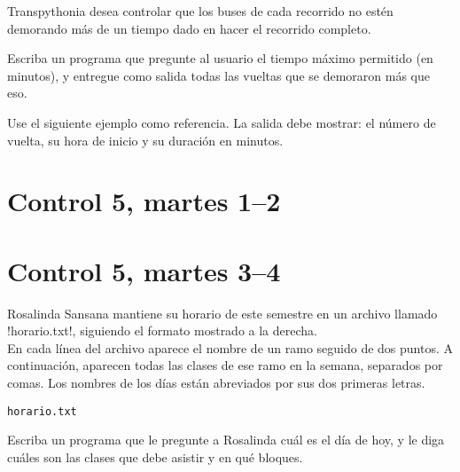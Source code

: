 \documentclass[12pt,spanish,a5paper,landscape]{article}
\begin{document}
  Transpythonia desea controlar que los buses de cada recorrido
  no estén demorando más de un tiempo dado
  en hacer el recorrido completo.

  Escriba un programa que pregunte al usuario
  el tiempo máximo permitido (en minutos),
  y entregue como salida todas las vueltas
  que se demoraron más que eso.

  Use el siguiente ejemplo como referencia.
  La salida debe mostrar:
  el número de vuelta,
  su hora de inicio
  y su duración en minutos.

  \begin{minipage}[t]{0.6\textwidth}
    
  \end{minipage}


  \newpage

  \part*{Control 5, martes 1--2}
  \newpage

  \newpage

  \part*{Control 5, martes 3--4}
  \newpage

  \begin{minipage}[t]{0.48\textwidth}
    Rosalinda Sansana mantiene su horario de este semestre
    en un archivo llamado \li!horario.txt!,
    siguiendo el formato mostrado a la derecha.
    \\[2ex]
    En cada línea del archivo aparece el nombre de un ramo
    seguido de dos puntos.
    A continuación,
    aparecen todas las clases de ese ramo en la semana,
    separados por comas.
    Los nombres de los días están abreviados
    por sus dos primeras letras.
  \end{minipage}
  \hfill
  \begin{minipage}[t]{0.42\textwidth}
    \hfil\verb!horario.txt!\hfil
    
  \end{minipage}

  Escriba un programa que le pregunte a Rosalinda
  cuál es el día de hoy,
  y le diga cuáles son las clases que debe asistir
  y en qué bloques.

  \begin{minipage}[t]{0.6\textwidth}
    
  \end{minipage}
\end{document}
